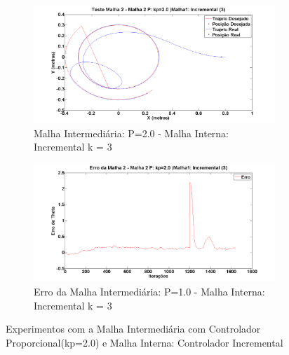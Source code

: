 \begin{figure}[!htb]
 	\centering
 	\begin{subfigure}{1.0\textwidth}
 		\centering
 		\includegraphics[width=.9\linewidth]{./Testes/Malha2/P2.0/Incremental-3/m2PosInc}
 		\caption{Malha Intermediária: P=2.0 - Malha Interna: Incremental k = 3}
 		\label{fig:m2incpos}
 	\end{subfigure}
 	\begin{subfigure}{1.0\textwidth}
 		\centering
 		\includegraphics[width=.9\linewidth]{./Testes/Malha2/P2.0/Incremental-3/ErroM2Inc}
 		\caption{Erro da Malha Intermediária: P=1.0 - Malha Interna: Incremental k = 3}
 		\label{fig:m2incerr}
 	\end{subfigure}
 	\caption{Experimentos com a Malha Intermediária com Controlador Proporcional(kp=2.0) e Malha Interna: Controlador Incremental}
 	\label{fig:m2inc}
 \end{figure}
 
